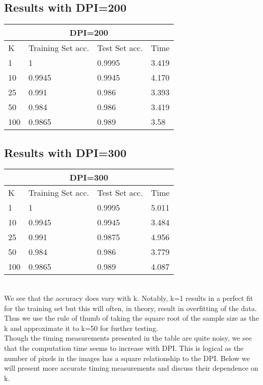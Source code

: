 \documentclass[paper=a4, fontsize=11pt]{scrartcl} %
\numberwithin{equation}{section} %
\numberwithin{figure}{section} %
\numberwithin{table}{section} %
\begin{document}
\subsection*{Results with DPI=200}
\begin{tabular}{ |p{3cm}|p{3cm}|p{3cm}|p{3cm}|  }
 \hline
 \multicolumn{4}{|c|}{DPI=200} \\
 \hline
 K & Training Set acc. & Test Set acc. & Time\\
 \hline
 1 & 1 & 0.9995 & 3.419\\
 10 & 0.9945 & 0.9945 & 4.170\\
 25 & 0.991 & 0.986 & 3.393\\
 50 & 0.984 & 0.986 & 3.419\\
 100 & 0.9865 & 0.989 & 3.58\\
 \hline
\end{tabular}

\subsection*{Results with DPI=300}
\begin{tabular}{ |p{3cm}|p{3cm}|p{3cm}|p{3cm}|  }
 \hline
 \multicolumn{4}{|c|}{DPI=300} \\
 \hline
 K & Training Set acc. & Test Set acc. & Time\\
 \hline
 1 & 1 & 0.9995 & 5.011\\
 10 & 0.9945 & 0.9945 & 3.484\\
 25 & 0.991 & 0.9875 & 4.956\\
 50 & 0.984 & 0.986 & 3.779\\
 100 & 0.9865 & 0.989 & 4.087\\
 \hline
\end{tabular}\\

We see that the accuracy does vary with k. Notably, k=1 results in a perfect fit for the training set but this will often, in theory, result in overfitting of the data. Thus we use the rule of thumb of taking the square root of the sample size as the k and approximate it to k=50 for further testing.\\

Though the timing measurements presented in the table are quite noisy, we see that the computation time seems to increase with DPI. This is logical as the number of pixels in the images has a square relationship to the DPI. Below we will present more accurate timing measurements and discuss their dependence on k.\\
\end{document}

